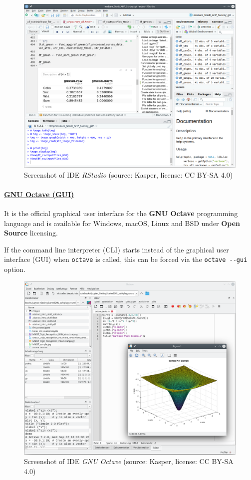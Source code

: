 \documentclass [oneside,10pt,a4paper,ngerman,BCOR10mm,headsepline,parindent,final]{scrartcl}
\begin{document}
\begin{figure}
\centering
\includegraphics{images/Screenshot_RStudio.png}
\caption{Screenshot of IDE \emph{RStudio} (source: Kasper, license: CC
BY-SA 4.0)}
\end{figure}

    \hypertarget{gnu-octave-gui}{%
\paragraph{\texorpdfstring{\href{https://en.wikipedia.org/wiki/GNU_Octave\#User_interfaces}{GNU
Octave (GUI)}}{GNU Octave (GUI)}}\label{gnu-octave-gui}}

It is the official graphical user interface for the \textbf{GNU Octave}
programming language and is available for Windows, macOS, Linux and BSD
under \textbf{Open Source} licensing.

If the command line interpreter (CLI) starts instead of the graphical
user interface (GUI) when \texttt{octave} is called, this can be forced
via the \texttt{octave\ -\/-gui} option.

\begin{figure}
\centering
\includegraphics{images/Screenshot_GNU_Octave.png}
\caption{Screenshot of IDE \emph{GNU Octave} (source: Kasper, license:
CC BY-SA 4.0)}
\end{figure}
\end{document}
